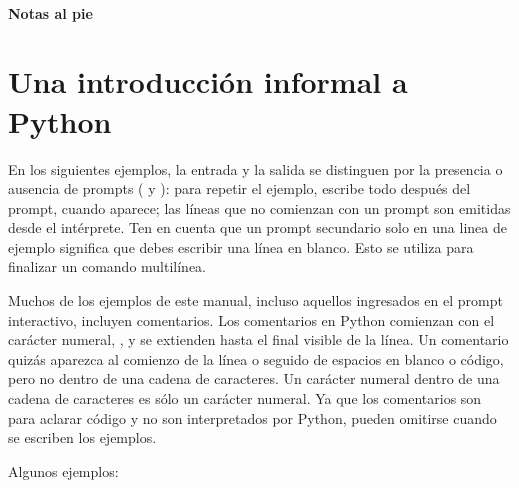 \documentclass[a4,10pt,spanish]{sphinxmanual}
\begin{document}
\begin{sphinxVerbatim}[commandchars=\\\{\}]
\end{sphinxVerbatim}
\subsubsection*{Notas al pie}


\chapter{Una introducción informal a Python}
\label{\detokenize{tutorial/introduction:an-informal-introduction-to-python}}\label{\detokenize{tutorial/introduction:tut-informal}}\label{\detokenize{tutorial/introduction::doc}}
\sphinxAtStartPar
En los siguientes ejemplos, la entrada y la salida se distinguen por la presencia o ausencia de prompts ({\hyperref[\detokenize{glossary:term-0}]{}} y {\hyperref[\detokenize{glossary:term-...}]{}}): para repetir el ejemplo, escribe todo después del prompt, cuando aparece; las líneas que no comienzan con un prompt son emitidas desde el intérprete. Ten en cuenta que un prompt secundario solo en una linea de ejemplo significa que debes escribir una línea en blanco. Esto se utiliza para finalizar un comando multilínea.

\ignorespaces 
\sphinxAtStartPar
Muchos de los ejemplos de este manual, incluso aquellos ingresados en el prompt interactivo, incluyen comentarios. Los comentarios en Python comienzan con el carácter numeral, \sphinxcode{\sphinxupquote{\#}}, y se extienden hasta el final visible de la línea. Un comentario quizás aparezca al comienzo de la línea o seguido de espacios en blanco o código, pero no dentro de una cadena de caracteres. Un carácter numeral dentro de una cadena de caracteres es sólo un carácter numeral. Ya que los comentarios son para aclarar código y no son interpretados por Python, pueden omitirse cuando se escriben los ejemplos.

\sphinxAtStartPar
Algunos ejemplos:

\begin{sphinxVerbatim}[commandchars=\\\{\}]
    
  
\end{sphinxVerbatim}
\end{document}
